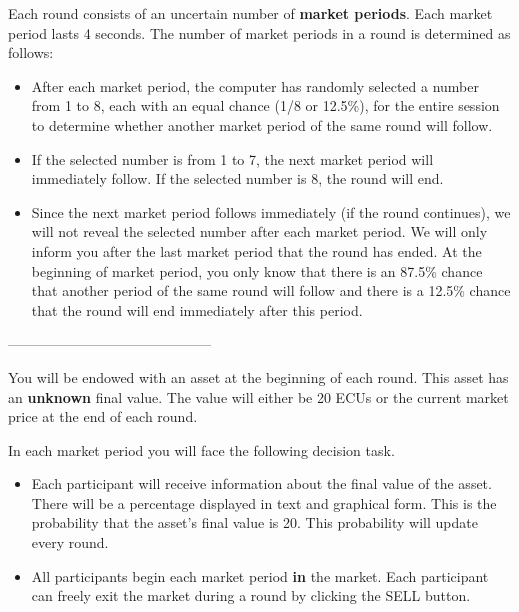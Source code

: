 \documentclass[thesis]{uathesis}
\begin{document}
\begin{body}
\begin{appendices}
Each round consists of an uncertain number of \textbf{market periods}. Each market period lasts 4 seconds. The number of market periods in a round is determined as follows:
\begin{itemize}
    \item   After each market period, the computer has randomly selected a number from 1 to 8, each with an equal chance (1/8 or 12.5\%), for the entire session to determine whether another market period of the same round will follow.
    \item 	If the selected number is from 1 to 7, the next market period will immediately follow. If the selected number is 8, the round will end.
    \item 	Since the next market period follows immediately (if the round continues), we will not reveal the selected number after each market period. We will only inform you after the last market period that the round has ended. At the beginning of market period, you only know that there is an 87.5\% chance that another period of the same round will follow and there is a 12.5\% chance that the round will end immediately after this period.
\end{itemize}


\vspace{0.2in}
\begin{center}
--------------------------------------------
\end{center}
\vspace{0.2in}


You will be endowed with an asset at the beginning of each round. This asset has an \textbf{unknown} final value. The value will either be 20 ECUs or the current market price at the end of each round.

\vspace{0.2in}

In each market period you will face the following decision task.

\begin{itemize}

    \item Each participant will receive information about the final value of the asset. There will be a percentage displayed in text and graphical form. This is the probability that the asset's final value is 20. This probability will update every round.

    \item All participants begin each market period \textbf{in} the market. Each participant can freely exit the market during a round by clicking the SELL button.


\end{itemize}
\end{appendices}
\end{body}
\end{document}
